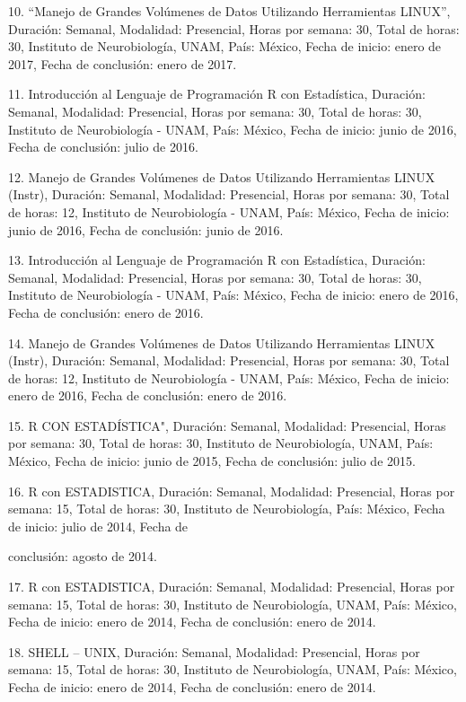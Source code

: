 10. “Manejo de Grandes Volúmenes de Datos Utilizando Herramientas LINUX”, Duración: Semanal, 
Modalidad: Presencial, Horas por semana: 30, Total de horas: 30, Instituto de Neurobiología, UNAM, 
País: México, Fecha de inicio: enero de 2017, Fecha de conclusión: enero de 2017.

11. Introducción al Lenguaje de Programación R con Estadística, Duración: Semanal, Modalidad: 
Presencial, Horas por semana: 30, Total de horas: 30, Instituto de Neurobiología - UNAM, País: 
México, Fecha de inicio: junio de 2016, Fecha de conclusión: julio de 2016.

12. Manejo de Grandes Volúmenes de Datos Utilizando Herramientas LINUX (Instr), Duración: Semanal, 
Modalidad: Presencial, Horas por semana: 30, Total de horas: 12, Instituto de Neurobiología - UNAM, 
País: México, Fecha de inicio: junio de 2016, Fecha de conclusión: junio de 2016.

13. Introducción al Lenguaje de Programación R con Estadística, Duración: Semanal, Modalidad: 
Presencial, Horas por semana: 30, Total de horas: 30, Instituto de Neurobiología - UNAM, País: 
México, Fecha de inicio: enero de 2016, Fecha de conclusión: enero de 2016.

14. Manejo de Grandes Volúmenes de Datos Utilizando Herramientas LINUX (Instr), Duración: Semanal, 
Modalidad: Presencial, Horas por semana: 30, Total de horas: 12, Instituto de Neurobiología - UNAM, 
País: México, Fecha de inicio: enero de 2016, Fecha de conclusión: enero de 2016.

15. R CON ESTADÍSTICA", Duración: Semanal, Modalidad: Presencial, Horas por semana: 30, Total de 
horas: 30, Instituto de Neurobiología, UNAM, País: México, Fecha de inicio: junio de 2015, Fecha de 
conclusión: julio de 2015.

16. R con ESTADISTICA, Duración: Semanal, Modalidad: Presencial, Horas por semana: 15, Total de 
horas: 30, Instituto de Neurobiología, País: México, Fecha de inicio: julio de 2014, Fecha de

conclusión: agosto de 2014.

17. R con ESTADISTICA, Duración: Semanal, Modalidad: Presencial, Horas por semana: 15, Total de 
horas: 30, Instituto de Neurobiología, UNAM, País: México, Fecha de inicio: enero de 2014, Fecha de 
conclusión: enero de 2014.

18. SHELL – UNIX, Duración: Semanal, Modalidad: Presencial, Horas por semana: 15, Total de horas: 
30, Instituto de Neurobiología, UNAM, País: México, Fecha de inicio: enero de 2014, Fecha de 
conclusión: enero de 2014.

